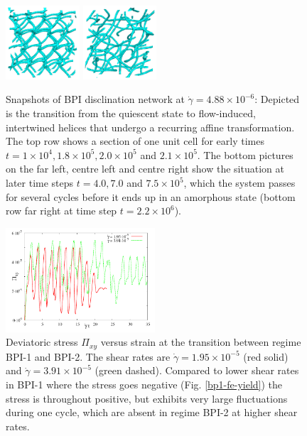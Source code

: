\documentclass[aps,pre,reprint,superscriptaddress, twocolumn]{revtex4}
\newcommand{\e}[1]{\times10^{#1}}
\newcommand{\gd}{\dot{\gamma}}
\begin{document}
\begin{figure}[htpb]
\includegraphics[width=0.245\textwidth]{disc-xy-750k_run1115.png}
\includegraphics[width=0.245\textwidth]{disc-xy-2200k_run1115.png}
\caption{Snapshots of BPI disclination network at $\dot{\gamma}=4.88\e{-6}$: 
Depicted is the transition from the quiescent state to flow-induced, intertwined 
helices that undergo a recurring affine transformation. The top row
shows a section of one unit cell for early times 
$t=1\e{4}, 1.8\e{5}, 2.0\e{5}$ and $2.1\e{5}$. The bottom 
pictures on the far left, centre left and centre right 
show the situation at later time steps $t=4.0, 7.0$ and $7.5\e{5}$,
which the system passes for several cycles before it ends up in
an amorphous state (bottom row far right at time step $t=2.2\e{6}$).}
\label{bp1-low}
\end{figure}

\fi

\begin{figure}[htpb]
\includegraphics[width=0.495\textwidth]{stress_bp1-1_bp1-2.pdf}
\caption{Deviatoric stress $\Pi_{xy}$ versus strain at the transition between regime
BPI-1 and BPI-2. The shear rates are $\gd=1.95\e{-5}$ (red solid) 
and $\gd=3.91\e{-5}$ (green dashed). Compared to lower shear rates in BPI-1 
where the stress goes negative (Fig. \ref{bp1-fe-yield}) the stress is 
throughout positive, but exhibits very large fluctuations during one cycle, 
which are absent in regime BPI-2 at higher shear rates.}
\label{bp1-1_bp1-2}
\end{figure}
\end{document}
